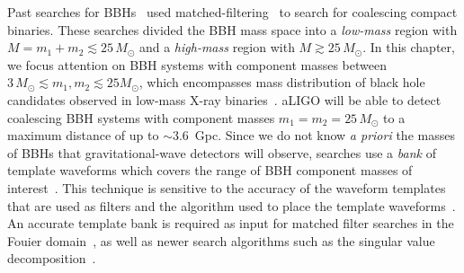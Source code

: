 Past searches for
BBHs~\cite{Colaboration:2011nz,Abadie:2010yb,Abbott:2009qj,Abbott:2009tt,Messaritaki:2005wv}
used matched-filtering~\cite{Wainstein:1962,Allen:2005fk} to search for
coalescing compact binaries. These searches divided the BBH mass space into a
\emph{low-mass} region with $M = m_1 + m_2 \lesssim 25\, M_\odot$ and a
\emph{high-mass} region with $M \gtrsim 25 \, M_\odot$. In this chapter, we
focus attention on BBH systems with component masses between $3 \, M_{\odot}
\lesssim m_1, m_2 \lesssim 25 M_{\odot}$, which encompasses mass distribution
of black hole candidates observed in low-mass X-ray
binaries~\cite{Ozel:2010su}. aLIGO will be able to detect coalescing BBH
systems with component masses $m_1 = m_2 = 25 \, M_{\odot}$ to a maximum
distance of up to $\sim 3.6$~Gpc.  Since we do not know \emph{a priori} the
masses of BBHs that gravitational-wave detectors will observe, searches use a
\textit{bank} of template waveforms which covers the range of BBH component
masses of interest~\cite{Sathyaprakash:1991mt,Balasubramanian:1995bm}.  This
technique is sensitive to the accuracy of the waveform templates that are used
as filters and the algorithm used to place the template
waveforms~\cite{FittingFactorApostolatos}. An accurate template bank is
required as input for matched filter
searches in the Fouier domain~\cite{Allen:2005fk}, as well as newer search algorithms such as the
singular value
decomposition~\cite{Cannon:2010qh}. 

